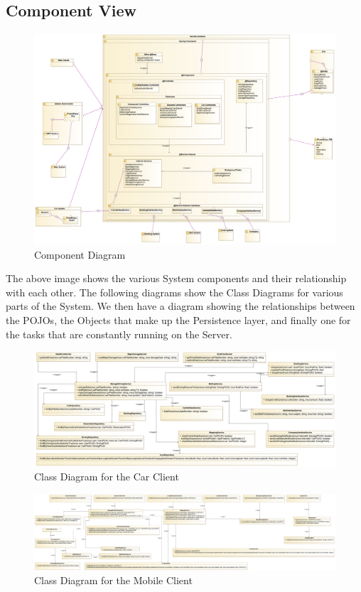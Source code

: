 \documentclass[12pt]{article}
\begin{document}
\subsection{Component View}
\begin{figure}[h]
	\centering
	\includegraphics[width=\textwidth]{../Images/Component}
	\caption{Component Diagram}
\end{figure}
The above image shows the various System components and their relationship with each other. The following diagrams show the Class Diagrams for various parts of the System.
We then have a diagram showing the relationships between the POJOs, the Objects that make up the Persistence layer, and finally one for the tasks that are constantly running on the Server.

\begin{figure}[h]
	\centering
	\includegraphics[width=\textwidth]{../Images/CarClient_Class}
	\caption{Class Diagram for the Car Client}
\end{figure}

\begin{figure}[h]
	\centering
	\includegraphics[width=\textwidth]{../Images/MobileClient_Class}
	\caption{Class Diagram for the Mobile Client}
\end{figure}
\end{document}
